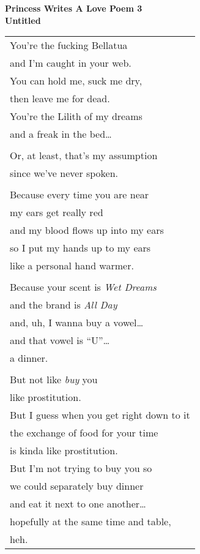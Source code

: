 \documentclass{article}
\begin{document}
\begin{center}
\textbf{Princess Writes A Love Poem 3} \\
{\small\textbf{Untitled}} \\
\vspace*{2ex}
\begin{tabular}{l}
You're the fucking Bellatua \\
and I'm caught in your web. \\
You can hold me, suck me dry, \\
then leave me for dead. \\
You're the Lilith of my dreams \\
and a freak in the bed\ldots \\
\\
Or, at least, that's my assumption \\
since we've never spoken. \\
\\
Because every time you are near \\
my ears get really red \\
and my blood flows up into my ears \\
so I put my hands up to my ears \\
like a personal hand warmer. \\
\\
Because your scent is \textit{Wet Dreams} \\
and the brand is \textit{All Day} \\
and, uh, I wanna buy a vowel\ldots \\
and that vowel is ``U''\ldots \\
a dinner. \\
\\
But not like \textit{buy} you \\
like prostitution. \\
But I guess when you get right down to it \\
the exchange of food for your time \\
is kinda like prostitution. \\
But I'm not trying to buy you so \\
we could separately buy dinner \\
and eat it next to one another\ldots \\
hopefully at the same time and table, \\
heh.
\end{tabular}
\end{center}
\end{document}
